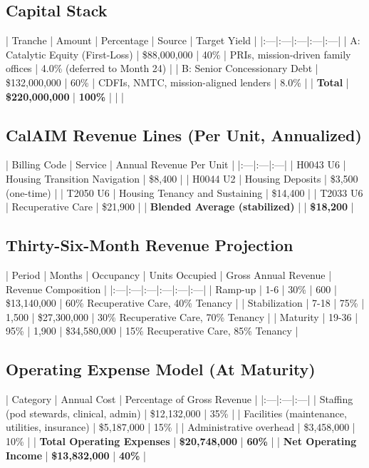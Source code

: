 \documentclass[12pt, letterpaper]{article}
\begin{document}
\subsection{Capital Stack}

| Tranche | Amount | Percentage | Source | Target Yield |
|:---|:---|:---|:---|:---|
| A: Catalytic Equity (First-Loss) | \$88,000,000 | 40\% | PRIs, mission-driven family offices | 4.0\% (deferred to Month 24) |
| B: Senior Concessionary Debt | \$132,000,000 | 60\% | CDFIs, NMTC, mission-aligned lenders | 8.0\% |
| \textbf{Total} | \textbf{\$220,000,000} | \textbf{100\%} | | |

\subsection{CalAIM Revenue Lines (Per Unit, Annualized)}

| Billing Code | Service | Annual Revenue Per Unit |
|:---|:---|:---|
| H0043 U6 | Housing Transition Navigation | \$8,400 |
| H0044 U2 | Housing Deposits | \$3,500 (one-time) |
| T2050 U6 | Housing Tenancy and Sustaining | \$14,400 |
| T2033 U6 | Recuperative Care | \$21,900 |
| \textbf{Blended Average (stabilized)} | | \textbf{\$18,200} |

\subsection{Thirty-Six-Month Revenue Projection}

| Period | Months | Occupancy | Units Occupied | Gross Annual Revenue | Revenue Composition |
|:---|:---|:---|:---|:---|:---|
| Ramp-up | 1-6 | 30\% | 600 | \$13,140,000 | 60\% Recuperative Care, 40\% Tenancy |
| Stabilization | 7-18 | 75\% | 1,500 | \$27,300,000 | 30\% Recuperative Care, 70\% Tenancy |
| Maturity | 19-36 | 95\% | 1,900 | \$34,580,000 | 15\% Recuperative Care, 85\% Tenancy |

\subsection{Operating Expense Model (At Maturity)}

| Category | Annual Cost | Percentage of Gross Revenue |
|:---|:---|:---|
| Staffing (pod stewards, clinical, admin) | \$12,132,000 | 35\% |
| Facilities (maintenance, utilities, insurance) | \$5,187,000 | 15\% |
| Administrative overhead | \$3,458,000 | 10\% |
| \textbf{Total Operating Expenses} | \textbf{\$20,748,000} | \textbf{60\%} |
| \textbf{Net Operating Income} | \textbf{\$13,832,000} | \textbf{40\%} |
\end{document}
